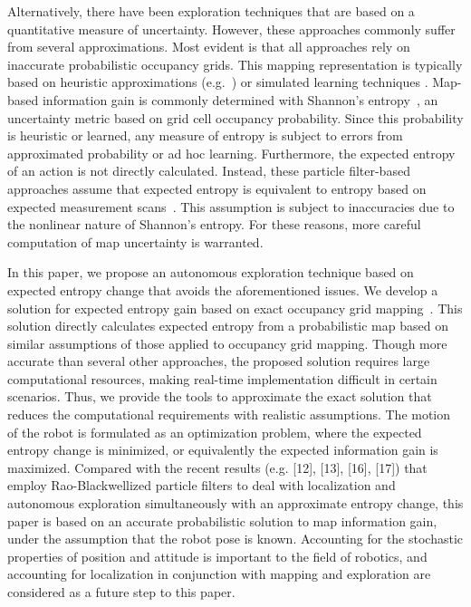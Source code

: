 \documentclass[smallextended]{svjour3}       %
\begin{document}
Alternatively, there have been exploration techniques that are based on a quantitative measure of uncertainty. However, these approaches commonly suffer from several approximations. Most evident is that all approaches rely on inaccurate probabilistic occupancy grids. 
This mapping representation is typically based on heuristic approximations (e.g.~\cite{MorElf85,Elf89,ChoLynHutKanBurKavThr05,And09,PirRutBisSch11}) or simulated learning techniques \cite{ThrBurFox05,Thr01}. Map-based information gain is commonly determined with Shannon's entropy~\cite{StaGriBur05}, an uncertainty metric based on grid cell occupancy probability. Since this probability is heuristic or learned, any measure of entropy is subject to errors from approximated probability or ad hoc learning.
Furthermore, the expected entropy of an action is not directly calculated. Instead, these particle filter-based approaches assume that expected entropy is equivalent to entropy based on expected measurement scans~\cite{JohStaPfaBur07}. This assumption is subject to inaccuracies due to the nonlinear nature of Shannon's entropy. For these reasons, more careful computation of map uncertainty is warranted. %

In this paper, we propose an autonomous exploration technique based on expected entropy change that avoids the aforementioned issues. 
We develop a solution for expected entropy gain based on exact occupancy grid mapping~\cite{KauLeeAiMos16}. This solution directly calculates expected entropy from a probabilistic map based on similar assumptions of those applied to occupancy grid mapping.
Though more accurate than several other approaches, the proposed solution requires large computational resources, making real-time implementation difficult in certain scenarios.
Thus, we provide the tools to approximate the exact solution that reduces the computational requirements with realistic assumptions.
The motion of the robot is formulated as an optimization problem, where the expected entropy change is minimized, or equivalently the expected information gain is maximized.
Compared with the recent results (e.g. [12], [13], [16], [17]) that employ Rao-Blackwellized particle filters to deal with localization and autonomous exploration simultaneously with an approximate entropy change, this paper is based on an accurate probabilistic solution to map information gain, under the assumption that the robot pose is known. Accounting for the stochastic properties of position and attitude is important to the field of robotics, and accounting for localization in conjunction with mapping and exploration are considered as a future step to this paper.
\end{document}
